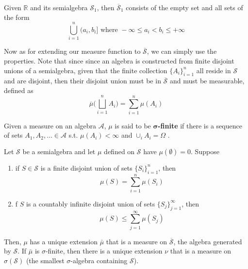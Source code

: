   \begin{example}
    Given $\mathbb{R}$ and its semialgebra $\mathcal{S}_1$, then $\overline{\mathcal{S}}_1$ consists of the empty set and all sets of the form 
    \begin{equation}
      \bigcup_{i=1}^n (a_i, b_i] \text{ where } -\infty \leq a_i < b_i \leq +\infty
    \end{equation}
  \end{example}

  Now as for extending our measure function to $\overline{\mathcal{S}}$, we can simply use the properties. Note that since since an algebra is constructed from finite disjoint unions of a semialgebra, given that the finite collection $\{A_i\}_{i=1}^n$ all reside in $\mathcal{S}$ and are disjoint, then their disjoint union must be in $\overline{\mathcal{S}}$ and must be measurable, defined as 
  \begin{equation}
    \overline{\mu} \bigg( \bigsqcup_{i=1}^n A_i \bigg) = \sum_{i=1}^n \mu(A_i)
  \end{equation}

  \begin{definition}
    Given a measure on an algebra $\mathcal{A}$, $\mu$ is said to be \textbf{$\boldsymbol{\sigma}$-finite} if there is a sequence of sets $A_1, A_2, \ldots \in \mathcal{A}$ s.t. $\mu(A_i) < \infty$ and $\cup_i A_i = \Omega$ . 
  \end{definition}

  \begin{theorem}
    Let $\mathcal{S}$ be a semialgebra and let $\mu$ defined on $\mathcal{S}$ have $\mu(\emptyset) = 0$. Suppose 
    \begin{enumerate}
      \item if $S \in \mathcal{S}$ is a finite disjoint union of sets $\{S_i\}_{i=1}^n$, then 
      \begin{equation}
        \mu(S) = \sum_{i=1}^n \mu(S_i)
      \end{equation}
      \item f $S$ is a countably infinite disjoint union of sets $\{S_j\}_{j=1}^\infty$, then 
      \begin{equation}
        \mu(S) \leq \sum_{j=1}^\infty \mu(S_j)
      \end{equation}
    \end{enumerate}
    Then, $\mu$ has a unique extension $\bar{\mu}$ that is a measure on $\overline{\mathcal{S}}$, the algebra generated by $\mathcal{S}$. If $\bar{\mu}$ is $\sigma$-finite, then there is a unique extension $\nu$ that is a measure on $\sigma(\mathcal{S})$ (the smallest $\sigma$-algebra containing $\mathcal{S}$). 
  \end{theorem}

